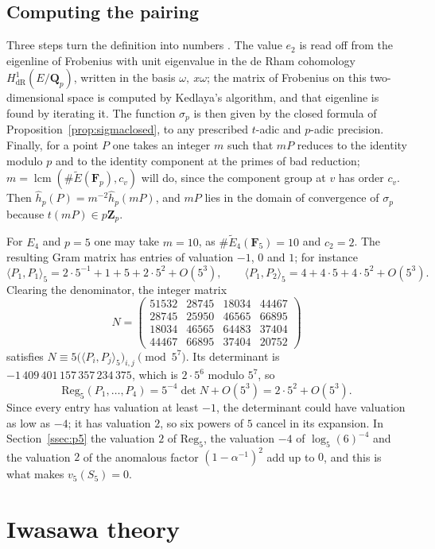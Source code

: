 \documentclass[11pt]{amsart}
\theoremstyle{definition}
\newcommand{\F}{\mathbf{F}}
\newcommand{\Zp}{\mathbf{Z}_p}
\newcommand{\Qp}{\mathbf{Q}_p}
\newcommand{\Reg}{\mathrm{Reg}}
\begin{document}
\subsection{Computing the pairing}\label{ssec:heightcomp}
Three steps turn the definition into numbers \cite{MST06}. The value $e_2$ is read off from the eigenline of Frobenius with unit eigenvalue in the de Rham cohomology $H^1_{\mathrm{dR}}(E/\Qp)$, written in the basis $\omega,\ x\omega$; the matrix of Frobenius on this two-dimensional space is computed by Kedlaya's algorithm, and that eigenline is found by iterating it. The function $\sigma_p$ is then given by the closed formula of Proposition~\ref{prop:sigmaclosed}, to any prescribed $t$-adic and $p$-adic precision. Finally, for a point $P$ one takes an integer $m$ such that $mP$ reduces to the identity modulo $p$ and to the identity component at the primes of bad reduction; $m=\operatorname{lcm}(\#\tilde E(\F_p),c_v)$ will do, since the component group at $v$ has order $c_v$. Then $\hat h_p(P)=m^{-2}\hat h_p(mP)$, and $mP$ lies in the domain of convergence of $\sigma_p$ because $t(mP)\in p\Zp$.

For $E_4$ and $p=5$ one may take $m=10$, as $\#\tilde E_4(\F_5)=10$ and $c_2=2$. The resulting Gram matrix has entries of valuation $-1$, $0$ and $1$; for instance
\[
\langle P_1,P_1\rangle_5=2\cdot5^{-1}+1+5+2\cdot5^2+O(5^3),\qquad \langle P_1,P_2\rangle_5=4+4\cdot5+4\cdot5^2+O(5^3).
\]
Clearing the denominator, the integer matrix
\[
N=\begin{pmatrix}
51532&28745&18034&44467\\
28745&25950&46565&66895\\
18034&46565&64483&37404\\
44467&66895&37404&20752
\end{pmatrix}
\]
satisfies $N\equiv5\bigl(\langle P_i,P_j\rangle_5\bigr)_{i,j}\pmod{5^7}$. Its determinant is $-1\,409\,401\,157\,357\,234\,375$, which is $2\cdot5^6$ modulo $5^7$, so
\[
\Reg_5(P_1,\dots,P_4)=5^{-4}\det N+O(5^3)=2\cdot5^2+O(5^3).
\]
Since every entry has valuation at least $-1$, the determinant could have valuation as low as $-4$; it has valuation $2$, so six powers of $5$ cancel in its expansion. In Section~\ref{ssec:p5} the valuation $2$ of $\Reg_5$, the valuation $-4$ of $\log_5(6)^{-4}$ and the valuation $2$ of the anomalous factor $(1-\alpha^{-1})^2$ add up to $0$, and this is what makes $v_5(S_5)=0$.

\section{Iwasawa theory}\label{sec:iwasawa}
\end{document}
